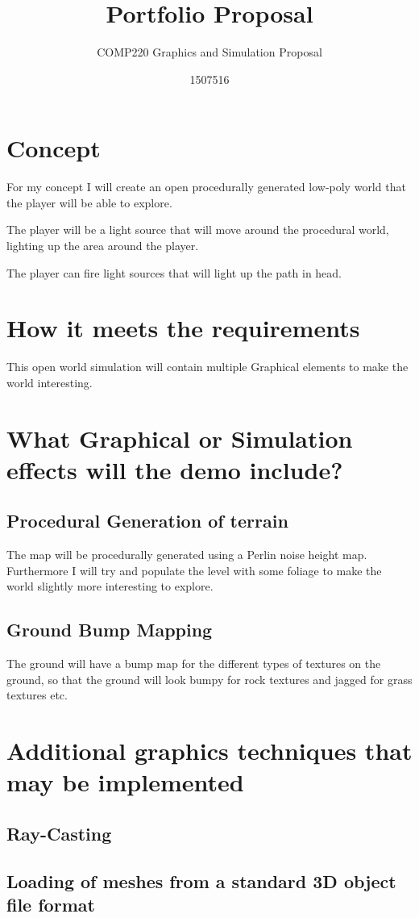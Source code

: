 \documentclass{scrartcl}
\title{Portfolio Proposal}
\subtitle{COMP220 Graphics and Simulation Proposal}
\author{1507516}
\begin{document}
\maketitle

\abstract{}

\section{Concept}
For my concept I will create an open procedurally generated low-poly world that the player will be able to explore.

The player will be a light source that will move around the procedural world, lighting up the area around the player.

The player can fire light sources that will light up the path in head.

\section{How it meets the requirements}

This open world simulation will contain multiple Graphical elements to make the world interesting.

\section{What Graphical or Simulation effects will the demo include?}

\subsection{Procedural Generation of terrain}

The map will be procedurally generated using a Perlin noise height map. Furthermore I will try and populate the level with some foliage to make the world slightly more interesting to explore.

\subsection{Ground Bump Mapping}

The ground will have a bump map for the different types of textures on the ground, so that the ground will look bumpy for rock textures and jagged for grass textures etc.

\section{Additional graphics techniques that may be implemented}

\subsection{Ray-Casting}
  
\subsection{Loading of meshes from a standard 3D object file format}
\end{document}
